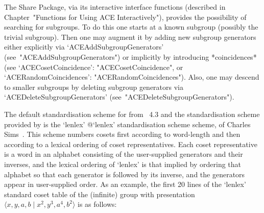 
The  {\ACE}  Share  Package,  via  its  interactive  {\ACE}  interface
functions   (described   in   Chapter~"Functions   for    Using    ACE
Interactively"), provides the possibility of searching for  subgroups.
To do this one starts  at  a  known  subgroup  (possibly  the  trivial
subgroup). Then one may augment it by adding new  subgroup  generators
either        explicitly        via         `ACEAddSubgroupGenerators'
(see~"ACEAddSubgroupGenerators")   or   implicitly   by    introducing
*coincidences*     (see      `ACECosetCoincidence':
"ACECosetCoincidence",           or           `ACERandomCoincidences':
"ACERandomCoincidences"). Also, one may descend to  smaller  subgroups
by  deleting  subgroup  generators  via  `ACEDeleteSubgroupGenerators'
(see~"ACEDeleteSubgroupGenerators").


The default standardisation scheme for {\GAP} from {\GAP}~4.3 and  the
standardisation    scheme    provided     by     {\ACE}     is     the
`lenlex'{\undoquotes{} {@`lenlex'
standardisation scheme}} scheme, of Charles  Sims~\cite{Sims94}.  This
scheme  numbers  cosets  first  according  to  word-length  and   then
according to a lexical ordering of coset representatives.  Each  coset
representative  is  a  word  in  an   alphabet   consisting   of   the
user-supplied generators and their inverses, and the lexical  ordering
of `lenlex' is that implied by ordering that  alphabet  so  that  each
generator is followed by its inverse, and  the  generators  appear  in
user-supplied order. As an example, the first 20 lines of the `lenlex'
standard  coset  table  of  the  (infinite)  group  with  presentation
$\langle x, y, a, b \mid x^2, y^3, a^4, b^2\rangle$ is as follows:

